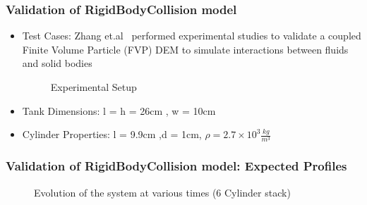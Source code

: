 \documentclass{beamer}
\begin{document}
  \begin{frame} %
  \frametitle{Validation of RigidBodyCollision model}
  	\begin{itemize}
  	 \item Test Cases: Zhang et.al\footnotemark ~ performed experimental studies to validate a coupled Finite Volume Particle (FVP) DEM to simulate interactions between fluids and solid bodies 
 	   \begin{figure}
 	   \caption{Experimental Setup}
 	   \end{figure}
 	   \item Tank Dimensions: l = h = 26cm , w = 10cm
 	   \item Cylinder Properties: l = 9.9cm ,d = 1cm, $\rho =2.7 \times 10^{3} \frac{kg}{m^3} $
    \end{itemize}
    
  \end{frame}
  
 \begin{frame} %
  \frametitle{Validation of RigidBodyCollision model: Expected Profiles} 
  	  \begin{figure}
 	   \caption{Evolution of the system at various times (6 Cylinder stack)}
 	   \end{figure}
  \end{frame}
 
\end{document}
